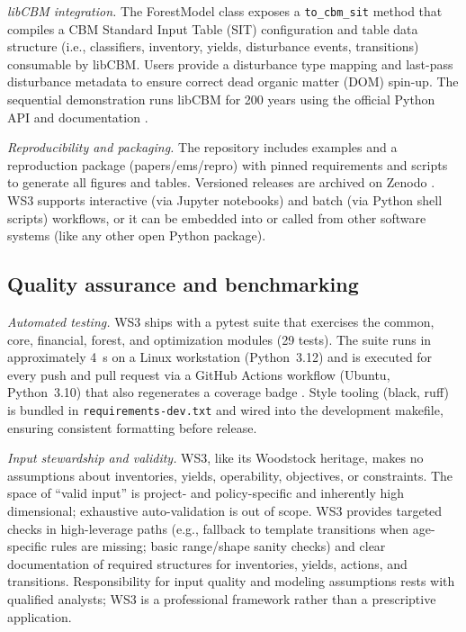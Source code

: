 \documentclass[review]{elsarticle}
\begin{document}
\emph{libCBM integration.} The ForestModel class exposes a \texttt{to\_cbm\_sit} method that compiles a CBM Standard Input Table (SIT) configuration and table data structure (i.e., classifiers, inventory, yields, disturbance events, transitions) consumable by libCBM. Users provide a disturbance type mapping and last-pass disturbance metadata to ensure correct dead organic matter (DOM) spin-up. The sequential demonstration runs libCBM for 200 years using the official Python API and documentation \citep{libcbm_py_docs, libcbm_py_repo}.

\emph{Reproducibility and packaging.} The repository includes examples and a reproduction package (papers/ems/repro) with pinned requirements and scripts to generate all figures and tables. Versioned releases are archived on Zenodo \citep{ws3_zenodo2025}. WS3 supports interactive (via Jupyter notebooks) and batch (via Python shell scripts) workflows, or it can be embedded into or called from other software systems (like any other open Python package).

\subsection{Quality assurance and benchmarking}
\emph{Automated testing.} WS3 ships with a pytest suite that exercises the common, core, financial, forest, and optimization modules (29 tests). The suite runs in approximately 4~s on a Linux workstation (Python~3.12) and is executed for every push and pull request via a GitHub Actions workflow (Ubuntu, Python~3.10) that also regenerates a coverage badge \citep{ci_workflow}. Style tooling (black, ruff) is bundled in \texttt{requirements-dev.txt} and wired into the development makefile, ensuring consistent formatting before release.

\emph{Input stewardship and validity.} WS3, like its Woodstock heritage, makes no assumptions about inventories, yields, operability, objectives, or constraints. The space of ``valid input'' is project- and policy-specific and inherently high dimensional; exhaustive auto-validation is out of scope. WS3 provides targeted checks in high-leverage paths (e.g., fallback to template transitions when age-specific rules are missing; basic range/shape sanity checks) and clear documentation of required structures for inventories, yields, actions, and transitions. Responsibility for input quality and modeling assumptions rests with qualified analysts; WS3 is a professional framework rather than a prescriptive application.
\end{document}
